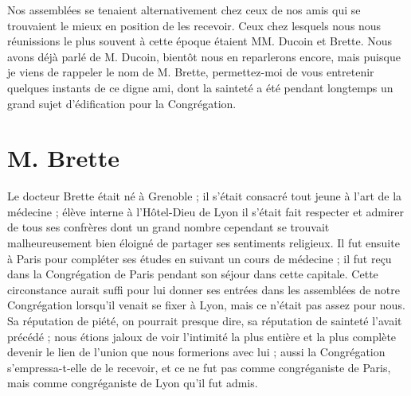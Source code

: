 Nos assemblées se tenaient alternativement chez ceux de nos amis qui se trouvaient le mieux en position de les recevoir. Ceux chez lesquels nous nous réunissions le plus souvent à cette époque étaient MM. Ducoin et Brette. Nous avons déjà parlé de M. Ducoin, bientôt nous en reparlerons encore, mais puisque je viens de rappeler le nom de M. Brette, permettez-moi de vous entretenir quelques instants de ce digne ami, dont la sainteté a été pendant longtemps un grand sujet d'édification pour la Congrégation.

\section*{M. Brette}
Le docteur Brette était né à Grenoble ; il s'était consacré tout jeune à l'art de la médecine ; élève interne à l'Hôtel-Dieu de Lyon il s'était fait respecter et admirer de tous ses confrères dont un grand nombre cependant se trouvait malheureusement bien éloigné de partager ses sentiments religieux. Il fut ensuite à Paris pour compléter ses études en suivant un cours de médecine ; il fut reçu dans la Congrégation de Paris pendant son séjour dans cette capitale. Cette circonstance aurait suffi pour lui donner ses entrées dans les assemblées de notre Congrégation lorsqu'il venait se fixer à Lyon, mais ce n'était pas assez pour nous. Sa réputation de piété, on pourrait presque dire, sa réputation de sainteté l'avait précédé ; nous étions jaloux de voir l'intimité la plus entière et la plus complète devenir le lien de l'union que nous formerions avec lui ; aussi la Congrégation s'empressa-t-elle de le recevoir, et ce ne fut pas comme congréganiste de Paris, mais
comme congréganiste de Lyon qu'il fut admis.
